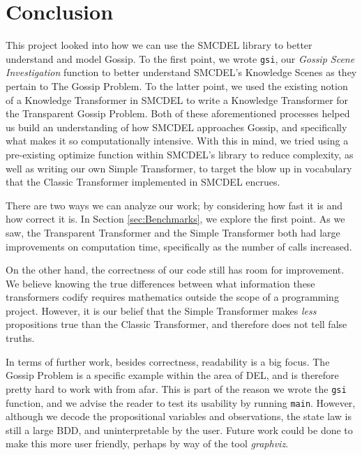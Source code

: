 
\section{Conclusion}\label{sec:Conclusion}

This project looked into how we can use the SMCDEL library to better understand and model Gossip. To the first point, we wrote \texttt{gsi}, our \textit{Gossip Scene Investigation} function to better understand SMCDEL's Knowledge Scenes as they pertain to The Gossip Problem. To the latter point, we used the existing notion of a Knowledge Transformer in SMCDEL to write a Knowledge Transformer for the Transparent Gossip Problem. Both of these aforementioned processes helped us build an understanding of how SMCDEL approaches Gossip, and specifically what makes it so computationally intensive. With this in mind, we tried using a pre-existing optimize function within SMCDEL's library to reduce complexity, as well as writing our own Simple Transformer, to target the blow up in vocabulary that the Classic Transformer implemented in SMCDEL encrues. 

There are two ways we can analyze our work; by considering how fast it is and how correct it is. In Section \ref{sec:Benchmarks}, we explore the first point. As we saw, the Transparent Transformer and the Simple Transformer both had large improvements on computation time, specifically as the number of calls increased. 

On the other hand, the correctness of our code still has room for improvement. We believe knowing the true differences between what information these transformers codify requires mathematics outside the scope of a programming project. However, it is our belief that the Simple Transformer makes \textit{less} propositions true than the Classic Transformer, and therefore does not tell false truths. 

In terms of further work, besides correctness, readability is a big focus. The Gossip Problem is a specific example within the area of DEL, and is therefore pretty hard to work with from afar. This is part of the reason we wrote the \texttt{gsi} function, and we advise the reader to test its usability by running \texttt{main}. However, although we decode the propositional variables and observations, the state law is still a large BDD, and uninterpretable by the user. Future work could be done to make this more user friendly, perhaps by way of the tool \textit{graphviz}. 

